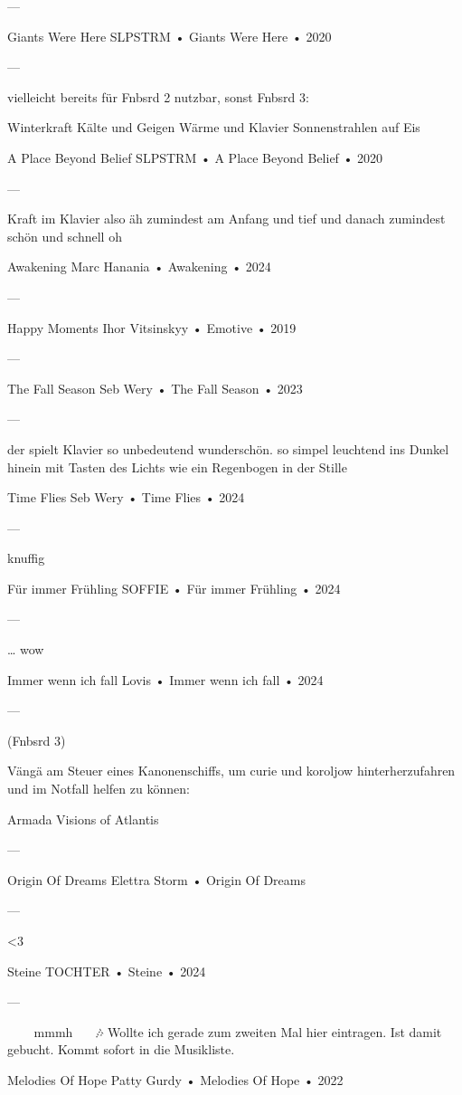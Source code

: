 —

Giants Were Here
SLPSTRM
 •
Giants Were Here
 •
2020

—

vielleicht bereits für Fnbsrd 2 nutzbar, sonst Fnbsrd 3:

Winterkraft
Kälte und Geigen
Wärme und Klavier
Sonnenstrahlen auf Eis

A Place Beyond Belief
SLPSTRM
 •
A Place Beyond Belief
 •
2020

—

Kraft im Klavier
also äh
zumindest am Anfang
und tief
und danach zumindest schön
und schnell
oh

Awakening
Marc Hanania
 •
Awakening
 •
2024


—

Happy Moments
Ihor Vitsinskyy
 •
Emotive
 •
2019

—

The Fall Season
Seb Wery
 •
The Fall Season
 •
2023

—

der spielt Klavier
so unbedeutend wunderschön.
so simpel leuchtend
ins Dunkel hinein
mit Tasten des Lichts
wie ein Regenbogen
in der Stille

Time Flies
Seb Wery
 •
Time Flies
 •
2024


—

knuffig

Für immer Frühling
SOFFIE
 •
Für immer Frühling
 •
2024

—

… wow

Immer wenn ich fall
Lovis
 •
Immer wenn ich fall
 •
2024


—

(Fnbsrd 3)

Vängä am Steuer eines Kanonenschiffs, um curie und koroljow hinterherzufahren und im Notfall helfen zu können:

Armada
Visions of Atlantis

—

Origin Of Dreams
Elettra Storm
 •
Origin Of Dreams

—

<3

Steine
TOCHTER
 •
Steine
 •
2024

—

🎵~~~ mmmh ~~~🎶
Wollte ich gerade zum zweiten Mal hier eintragen.
Ist damit gebucht. Kommt sofort in die Musikliste.

Melodies Of Hope
Patty Gurdy
 •
Melodies Of Hope
 •
2022

